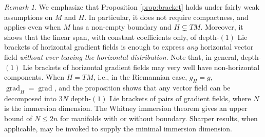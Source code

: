 \documentclass{article}
\theoremstyle{remark}
\newtheorem{remark}[theorem]{Remark}
\newcommand{\M}{M}
\DeclareMathOperator{\grad}{\mathrm{grad}}
\begin{document}
\begin{remark}
    We emphasize that Proposition \ref{prop:bracket} holds under fairly weak assumptions on $\M$ and $H$. In particular, it does not require compactness, and applies even when $\M$ has a non-empty boundary and $H\subsetneq T\M$. Moreover, it shows that the linear span, with constant coefficients only, of depth-$(1)$ Lie brackets of horizontal gradient fields is enough to express \emph{any} horizontal vector field \emph{without ever leaving the horizontal distribution}. Note that, in general, depth-$(1)$ Lie brackets of horizontal gradient fields may very well have non-horizontal components. When $H=T\M$, i.e., in the Riemannian case, $g_H=g$, $\grad_H=\grad$, and the proposition shows that any vector field can be decomposed into $3N$ depth-$(1)$ Lie brackets of pairs of gradient fields, where $N$ is the immersion dimension. The Whitney immersion theorem \cite[Theorem 6.18]{Lee2012} gives an upper bound of $N\leq 2n$ for manifolds with or without boundary. Sharper results, when applicable, may be invoked to supply the minimal immersion dimension. 
\end{remark}
%

%
\end{document}
